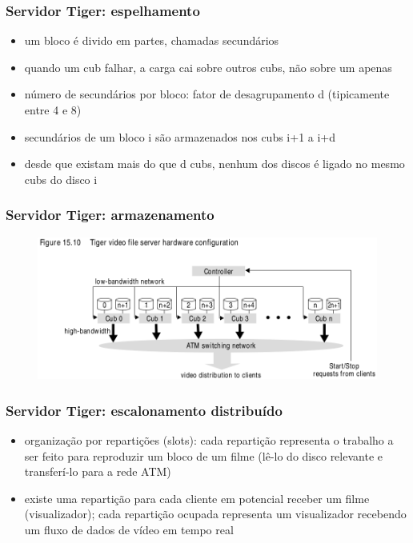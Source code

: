 \documentclass[]{beamer}
\begin{document}
\begin{frame}
 \frametitle{Servidor Tiger: espelhamento}
 \begin{itemize}
   \item um bloco é divido em partes, chamadas secundários
   \item quando um cub falhar, a carga cai sobre outros cubs, não sobre um apenas
   \item número de secundários por bloco: fator de desagrupamento d (tipicamente entre 4 e 8)
   \item secundários de um bloco i são armazenados nos cubs i+1 a i+d
   \item desde que existam mais do que d cubs, nenhum dos discos é ligado
no mesmo cubs do disco i
  \end{itemize}
\end{frame}

\begin{frame}
 \frametitle{Servidor Tiger: armazenamento}

  \begin{figure}[hbtp]
  \begin{center}
   \includegraphics[scale=0.28]{cubs_tiger.png}
  \end{center}
 \end{figure}
\end{frame}

\begin{frame}
 \frametitle{Servidor Tiger: escalonamento distribuído}
 \begin{itemize}
   \item organização por repartições (slots): cada repartição representa o trabalho a ser
feito para reproduzir um bloco de um filme (lê-lo do disco relevante e 
transferí-lo para a rede ATM)
   \item existe uma repartição para cada cliente em potencial receber um 
filme (visualizador); cada
repartição ocupada representa um visualizador recebendo um fluxo de dados de vídeo em tempo
real
  \end{itemize}
\end{frame}
\end{document}
